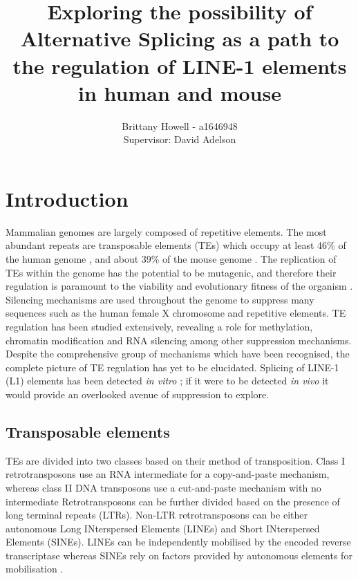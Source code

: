 \documentclass[12pt]{article}
\begin{document}
	
	\title{Exploring the possibility of Alternative Splicing as a path to the regulation of LINE-1 elements in human and mouse}
	\author{Brittany Howell - a1646948 \\ Supervisor: David Adelson}
	\date{}
	
	\maketitle
	
	
	\section{Introduction}
		
		Mammalian genomes are largely composed of repetitive elements.
		The most abundant repeats are transposable elements (TEs) which occupy at least 46\% of the human genome \citep{Lander01}, and about 39\% of the mouse genome \citep{Waterson02}.
		The replication of TEs within the genome has the potential to be mutagenic, and therefore their regulation is paramount to the viability and evolutionary fitness of the organism \citep{Bodak14}.
		Silencing mechanisms are used throughout the genome to suppress many sequences such as the human female X chromosome and repetitive elements. 
		TE regulation has been studied extensively, revealing a role for methylation, chromatin modification and RNA silencing among other suppression mechanisms. 
		Despite the comprehensive group of mechanisms which have been recognised, the complete picture of TE regulation has yet to be elucidated.
		Splicing of LINE-1 (L1) elements has been detected \textit{in vitro} \citep{Belancio06}; if it were to be detected \textit{in vivo} it would provide an overlooked avenue of suppression to explore. 
			
		
		\subsection{Transposable elements}
			
			TEs are divided into two classes based on their method of transposition. 
			Class I retrotransposons use an RNA intermediate for a copy-and-paste mechanism, whereas class II DNA transposons use a cut-and-paste mechanism with no intermediate \citep{Finnegan89,Feschotte07,Wicker07,Han10} 	Retrotransposons can be further divided based on the presence of long terminal repeats (LTRs).
			Non-LTR retrotransposons can be either autonomous Long INterspersed Elements (LINEs) and Short INterspersed Elements (SINEs).
			LINEs can be independently mobilised by the encoded reverse transcriptase whereas SINEs rely on factors provided by autonomous elements for mobilisation \citep{Jurka07}.
			
\end{document}
